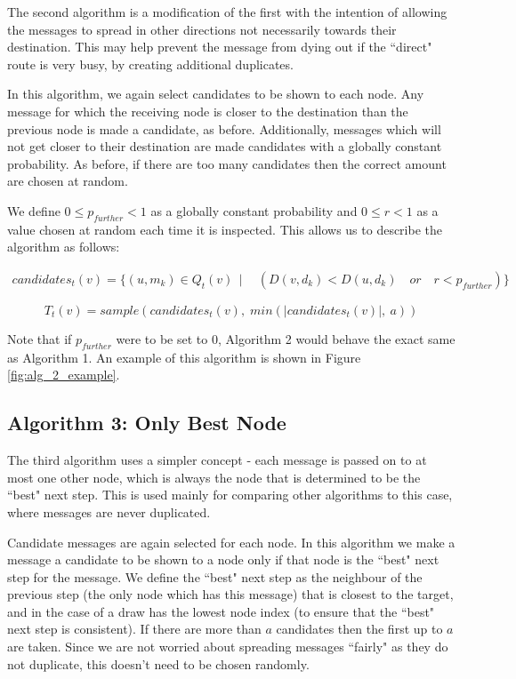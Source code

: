 \documentclass[bsc,frontabs,twoside,singlespacing,parskip,deptreport]{infthesis}     %
\begin{document}
The second algorithm is a modification of the first with the intention of allowing the messages to spread in other directions not necessarily towards their destination. This may help prevent the message from dying out if the ``direct" route is very busy, by creating additional duplicates.

In this algorithm, we again select candidates to be shown to each node. Any message for which the receiving node is closer to the destination than the previous node is made a candidate, as before. Additionally, messages which will not get closer to their destination are made candidates with a globally constant probability. As before, if there are too many candidates then the correct amount are chosen at random.

We define $0 \leq p_{further} < 1$ as a globally constant probability and $0 \leq r < 1$ as a value chosen at random each time it is inspected. This allows us to describe the algorithm as follows:

\begin{equation}
\begin{split}
candidates_{t}(v) = \{ (u, m_{k}) \in Q_{t}(v) \:\: | \:\: & (D(v, d_{k}) < D(u, d_{k}) \quad or \quad r < p_{further}) \}
\end{split}
\end{equation}

\begin{equation}
T_{t}(v) = sample(candidates_{t}(v), \; min(|candidates_{t}(v)|, \: a))
\end{equation}

Note that if $p_{further}$ were to be set to 0, Algorithm 2 would behave the exact same as Algorithm 1. An example of this algorithm is shown in Figure \ref{fig:alg_2_example}.

\subsection{Algorithm 3: Only Best Node}

The third algorithm uses a simpler concept - each message is passed on to at most one other node, which is always the node that is determined to be the ``best" next step. This is used mainly for comparing other algorithms to this case, where messages are never duplicated.

Candidate messages are again selected for each node. In this algorithm we make a message a candidate to be shown to a node only if that node is the ``best" next step for the message. We define the ``best" next step as the neighbour of the previous step (the only node which has this message) that is closest to the target, and in the case of a draw has the lowest node index (to ensure that the ``best" next step is consistent). If there are more than $a$ candidates then the first up to $a$ are taken. Since we are not worried about spreading messages ``fairly" as they do not duplicate, this doesn't need to be chosen randomly. 
\end{document}
